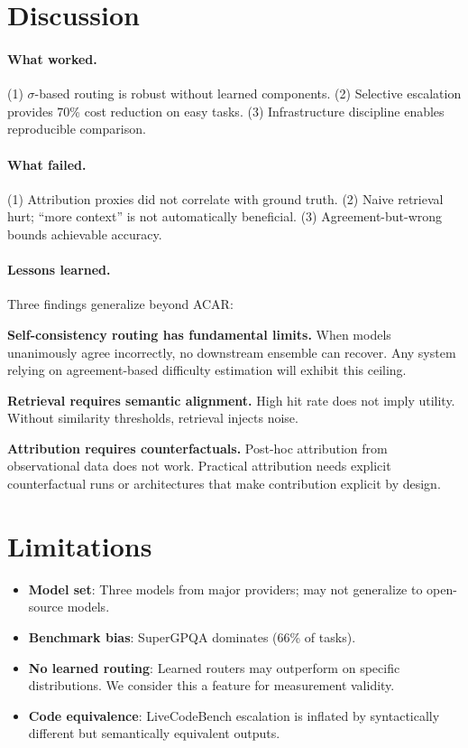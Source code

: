 \documentclass{article}
\newcommand{\acar}{\textsc{ACAR}}
\begin{document}
\section{Discussion}

\paragraph{What worked.}
(1) $\sigma$-based routing is robust without learned components.
(2) Selective escalation provides 70\% cost reduction on easy tasks.
(3) Infrastructure discipline enables reproducible comparison.

\paragraph{What failed.}
(1) Attribution proxies did not correlate with ground truth.
(2) Naive retrieval hurt; ``more context'' is not automatically beneficial.
(3) Agreement-but-wrong bounds achievable accuracy.

\paragraph{Lessons learned.}
Three findings generalize beyond \acar{}:

\textbf{Self-consistency routing has fundamental limits.} When models unanimously agree incorrectly, no downstream ensemble can recover. Any system relying on agreement-based difficulty estimation will exhibit this ceiling.

\textbf{Retrieval requires semantic alignment.} High hit rate does not imply utility. Without similarity thresholds, retrieval injects noise.

\textbf{Attribution requires counterfactuals.} Post-hoc attribution from observational data does not work. Practical attribution needs explicit counterfactual runs or architectures that make contribution explicit by design.

\section{Limitations}

\begin{itemize}[leftmargin=*, itemsep=2pt]
    \item \textbf{Model set}: Three models from major providers; may not generalize to open-source models.
    \item \textbf{Benchmark bias}: SuperGPQA dominates (66\% of tasks).
    \item \textbf{No learned routing}: Learned routers may outperform on specific distributions. We consider this a feature for measurement validity.
    \item \textbf{Code equivalence}: LiveCodeBench escalation is inflated by syntactically different but semantically equivalent outputs.
\end{itemize}
\end{document}
